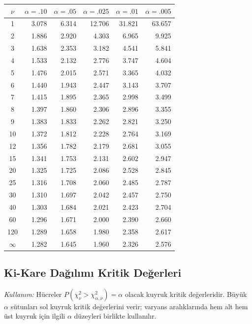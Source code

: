 \begin{center}
\small
\setlength{\tabcolsep}{6pt}
\begin{tabular}{c*{5}{r}}
\toprule
$\nu$ & $\alpha=.10$ & $\alpha=.05$ & $\alpha=.025$ & $\alpha=.01$ & $\alpha=.005$ \\
\midrule
1 & 3.078 & 6.314 & 12.706 & 31.821 & 63.657 \\
2 & 1.886 & 2.920 & 4.303 & 6.965 & 9.925 \\
3 & 1.638 & 2.353 & 3.182 & 4.541 & 5.841 \\
4 & 1.533 & 2.132 & 2.776 & 3.747 & 4.604 \\
5 & 1.476 & 2.015 & 2.571 & 3.365 & 4.032 \\
6 & 1.440 & 1.943 & 2.447 & 3.143 & 3.707 \\
7 & 1.415 & 1.895 & 2.365 & 2.998 & 3.499 \\
8 & 1.397 & 1.860 & 2.306 & 2.896 & 3.355 \\
9 & 1.383 & 1.833 & 2.262 & 2.821 & 3.250 \\
10 & 1.372 & 1.812 & 2.228 & 2.764 & 3.169 \\
12 & 1.356 & 1.782 & 2.179 & 2.681 & 3.055 \\
15 & 1.341 & 1.753 & 2.131 & 2.602 & 2.947 \\
20 & 1.325 & 1.725 & 2.086 & 2.528 & 2.845 \\
25 & 1.316 & 1.708 & 2.060 & 2.485 & 2.787 \\
30 & 1.310 & 1.697 & 2.042 & 2.457 & 2.750 \\
40 & 1.303 & 1.684 & 2.021 & 2.423 & 2.704 \\
60 & 1.296 & 1.671 & 2.000 & 2.390 & 2.660 \\
120 & 1.289 & 1.658 & 1.980 & 2.358 & 2.617 \\
$\infty$ & 1.282 & 1.645 & 1.960 & 2.326 & 2.576 \\

\bottomrule
\end{tabular}
\end{center}


\clearpage
\subsection{Ki-Kare Dağılımı Kritik Değerleri}
\textit{Kullanım:} Hücreler $P(\chi^2_\nu>\chi^2_{\alpha,\nu})=\alpha$ olacak kuyruk kritik değerleridir. Büyük $\alpha$ sütunları sol kuyruk kritik değerlerini verir; varyans aralıklarında hem alt hem üst kuyruk için ilgili $\alpha$ düzeyleri birlikte kullanılır.

